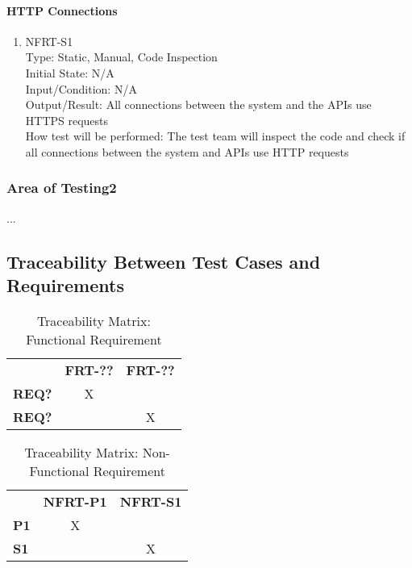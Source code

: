 \documentclass[12pt, titlepage]{article}
\begin{document}
\paragraph{HTTP Connections}
\begin{enumerate}

\item{NFRT-S1}\\
Type: Static, Manual, Code Inspection\\
Initial State: N/A\\
Input/Condition: N/A\\
Output/Result: All connections between the system and the APIs use HTTPS requests\\
How test will be performed: The test team will inspect the code and check if all connections between the system and APIs use HTTP requests
\end{enumerate}

\subsubsection{Area of Testing2}

...

\subsection{Traceability Between Test Cases and Requirements}
\begin{table}[H]
    \centering
    \caption{Traceability Matrix: Functional Requirement}
    \begin{tabular}{lcc}
        ~ & \textbf{FRT-??} & \textbf{FRT-??}\\
        \textbf{REQ?} & X & ~\\
        \textbf{REQ?} & ~ & X\\
    \end{tabular}
    \label{Traceability Matrix: Functional Requirement}
\end{table}

\begin{table}[H]
    \centering
    \caption{Traceability Matrix: Non-Functional Requirement}
    \begin{tabular}{lcc}
        ~ & \textbf{NFRT-P1} & \textbf{NFRT-S1}\\
        \textbf{P1} & X & ~\\
        \textbf{S1} & ~ & X\\
    \end{tabular}
    \label{Traceability Matrix: Non-Functional Requirement}
\end{table}
\end{document}
